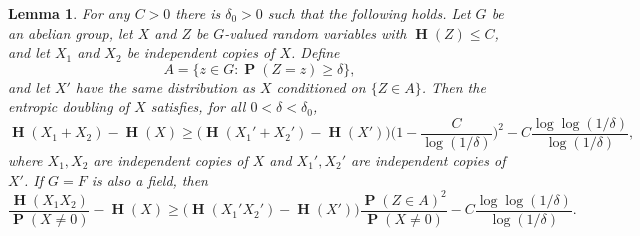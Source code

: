 \documentclass[10pt,a4paper]{amsart}
\newtheorem{lemma}{Lemma}
\DeclareMathOperator{\Eta}{\mathbf{H}}
\DeclareMathOperator{\pr}{\mathbf{P}}
\begin{document}
\begin{lemma}\label{lemZsupport}
For any $C>0$ there is $\delta_0 > 0$ such that the following holds.
Let $G$ be an abelian group, let
$X$ and $Z$ be $G$-valued random variables with $\Eta(Z) \leq C$, and let
$X_1$ and $X_2$ be independent copies of $X$. Define
$$A = \bigl\{z\in G : \pr(Z=z)\ge \delta\bigr\},$$
and let $X'$ have the same distribution as $X$ conditioned
on $\{Z\in A\}$.
Then the entropic doubling of $X$ satisfies,
for all $0<\delta<\delta_0$,
\begin{equation}
\Eta(X_1 + X_2) - \Eta(X)
\ge \bigl(\Eta(X_1' + X_2') - \Eta(X')\bigr)
\biggl(1-\frac{C}{\log(1/\delta)}\biggr)^2 
- C\frac{\log\log(1/\delta)}{\log(1/\delta)},
\label{eq:firstclaim}
\end{equation}
where $X_1,X_2$ are independent copies of $X$
and $X_1',X_2'$ are independent copies of $X'$.
If $G=F$ is also a field, then 
$$\frac{\Eta(X_1 X_2)}{\pr(X\ne 0)} - \Eta(X)
\ge \bigl(\Eta(X_1' X_2') - \Eta(X')\bigr)
\frac{\pr(Z\in A)^2}{\pr(X\ne 0)} 
- C\frac{\log\log(1/\delta)}{\log(1/\delta)}.$$
\end{lemma}
\end{document}
